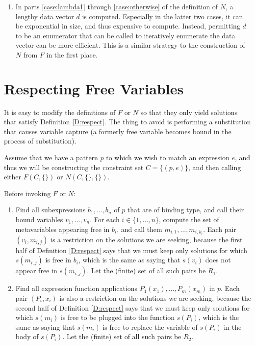 \documentclass{article}
\begin{document}
\begin{enumerate}
\item	In parts \ref{case:lambda1} through \ref{case:otherwise} of the definition of $N$, a lengthy data vector $d$ is computed.  Especially in the latter two cases, it can be exponential in size, and thus expensive to compute.  Instead, permitting $d$ to be an enumerator that can be called to iteratively enumerate the data vector can be more efficient.  This is a similar strategy to the construction of $N$ from $F$ in the first place.
\end{enumerate}

\section{Respecting Free Variables}\label{S:respect}%

It is easy to modify the definitions of $F$ or $N$ so that they only yield solutions that satisfy Definition \ref{D:respect}.  The thing to avoid is performing a substitution that causes variable capture (a formerly free variable becomes bound in the process of substitution).

Assume that we have a pattern $p$ to which we wish to match an expression $e$, and thus we will be constructing the constraint set $C=\{(p,e)\}$, and then calling either $F(C,\{\})$ or $N(C,\{\},\{\})$.

Before invoking $F$ or $N$:
\begin{enumerate}
\item	Find all subexpressions $b_1,\ldots,b_n$ of $p$ that are of binding type, and call their bound variables $v_1,\ldots,v_n$.  For each $i\in\{1,\ldots,n\}$, compute the set of metavariables appearing free in $b_i$, and call them $m_{i,1},\ldots,m_{i,k_i}$.  Each pair $(v_i,m_{i,j})$ is a restriction on the solutions we are seeking, because the first half of Definition \ref{D:respect} says that we must keep only solutions for which $s(m_{i,j})$ is free in $b_i$, which is the same as saying that $s(v_i)$ does not appear free in $s(m_{i,j})$.  Let the (finite) set of all such pairs be $R_1$.
\item	Find all expression function applications $P_1(x_1),\ldots,P_m(x_m)$ in $p$.  Each pair $(P_i,x_i)$ is also a restriction on the solutions we are seeking, because the second half of Definition \ref{D:respect} says that we must keep only solutions for which $s(m_i)$ is free to be plugged into the function $s(P_i)$, which is the same as saying that $s(m_i)$ is free to replace the variable of $s(P_i)$ in the body of $s(P_i)$.  Let the (finite) set of all such pairs be $R_2$.
\end{enumerate}
\end{document}
